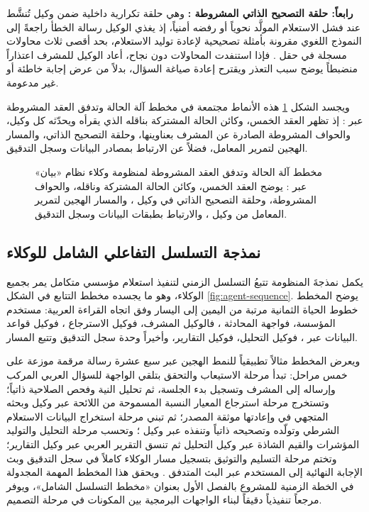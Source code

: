 \textbf{رابعاً: حلقة التصحيح الذاتي المشروطة :} وهي حلقة تكرارية داخلية ضمن وكيل  تُنشَّط عند فشل الاستعلام المولَّد نحوياً أو رفضه أمنياً، إذ يغذي الوكيل رسالة الخطأ راجعةً إلى النموذج اللغوي مقرونة بأمثلة تصحيحية  لإعادة توليد الاستعلام، بحد أقصى ثلاث محاولات مسجلة في حقل . فإذا استنفدت المحاولات دون نجاح، أعاد الوكيل للمشرف اعتذاراً منضبطاً يوضح سبب التعذر ويقترح إعادة صياغة السؤال، بدلاً من عرض إجابة خاطئة أو غير مدعومة.

ويجسد الشكل \ref{fig:agent-state-graph} هذه الأنماط مجتمعة في مخطط آلة الحالة وتدفق العقد المشروطة عبر : إذ تظهر العقد الخمس، وكائن الحالة المشتركة بناقله الذي يقرأه ويحدّثه كل وكيل، والحواف المشروطة الصادرة عن المشرف بعناوينها، وحلقة التصحيح الذاتي، والمسار الهجين لتمرير المعامل، فضلاً عن الارتباط بمصادر البيانات وسجل التدقيق.

\begin{figure}[H]
  \centering
  \resizebox{\textwidth}{!}{}
  \caption[مخطط آلة الحالة وتدفق العقد المشروطة لمنظومة الوكلاء عبر LangGraph]{مخطط آلة الحالة وتدفق العقد المشروطة لمنظومة وكلاء نظام «بيان» عبر  : يوضح العقد الخمس، وكائن الحالة المشتركة  وناقله، والحواف المشروطة، وحلقة التصحيح الذاتي في وكيل ، والمسار الهجين لتمرير المعامل من وكيل ، والارتباط بطبقات البيانات وسجل التدقيق.}
  \label{fig:agent-state-graph}
\end{figure}

\subsection{نمذجة التسلسل التفاعلي الشامل للوكلاء}
\label{subsec:agent-sequence-diagram}

يكمل نمذجةَ المنظومة تتبعُ التسلسل الزمني لتنفيذ استعلام مؤسسي متكامل يمر بجميع الوكلاء، وهو ما يجسده مخطط التتابع  في الشكل \ref{fig:agent-sequence}. يوضح المخطط خطوط الحياة الثمانية مرتبة من اليمين إلى اليسار وفق اتجاه القراءة العربية: مستخدم المؤسسة، فواجهة المحادثة ، فالوكيل المشرف، فوكيل الاسترجاع ، فوكيل قواعد البيانات عبر ، فوكيل التحليل، فوكيل التقارير، وأخيراً وحدة سجل التدقيق وتتبع المسار.

ويعرض المخطط مثالاً تطبيقياً للنمط الهجين عبر سبع عشرة رسالة مرقمة موزعة على خمس مراحل: تبدأ مرحلة الاستيعاب والتحقق بتلقي الواجهة للسؤال العربي المركب وإرساله إلى المشرف وتسجيل بدء الجلسة، ثم تحليل النية وفحص الصلاحية ذاتياً؛ وتستخرج مرحلة استرجاع المعيار النسبة المسموحة من اللائحة عبر وكيل  وبحثه المتجهي في  وإعادتها موثقة المصدر؛ ثم تبني مرحلة استخراج البيانات الاستعلام الشرطي وتولّده وتصحيحه ذاتياً وتنفذه عبر وكيل ؛ وتحسب مرحلة التحليل والتوليد المؤشرات والقيم الشاذة عبر وكيل التحليل ثم تنسق التقرير العربي عبر وكيل التقارير؛ وتختم مرحلة التسليم والتوثيق بتسجيل مسار الوكلاء كاملاً في سجل التدقيق وبث الإجابة النهائية إلى المستخدم عبر البث المتدفق . ويحقق هذا المخطط المهمة المجدولة في الخطة الزمنية للمشروع بالفصل الأول بعنوان «مخطط التسلسل الشامل»، ويوفر مرجعاً تنفيذياً دقيقاً لبناء الواجهات البرمجية بين المكونات في مرحلة التصميم.

